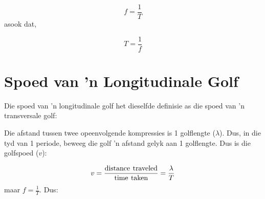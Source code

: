     \begin{equation}
    f=\frac{1}{T}
      \end{equation}
        \label{m38782*id291706}asook dat,\par 
        \label{m38782*id292764}\nopagebreak\noindent{}
    \begin{equation}
    T=\frac{1}{f}
      \end{equation}
      \label{m38782*uid11}
            \section{Spoed van 'n Longitudinale Golf}
            \nopagebreak
            \label{m38782*id292794}Die spoed van 'n longitudinale golf het dieselfde definisie as die spoed van 'n transversale golf:\par
%           

   
        \label{m38806*id319706}Die afstand tussen twee opeenvolgende kompressies is 1 golflengte ($\lambda$). Dus, in die tyd van 1 periode, beweeg die golf 'n afstand gelyk aan 1 golflengte. Dus is die golfspoed ($v$):\par 
        \label{m38806*id319732}\nopagebreak\noindent{}
    \begin{equation}
    v=\frac{\text{distance}\phantom{\rule{4.pt}{0ex}}\text{traveled}}{\text{time}\phantom{\rule{4.pt}{0ex}}\text{taken}}=\frac{\lambda }{T}
      \end{equation}
        \label{m38806*id319776}maar $f=\frac{1}{T}$. Dus:\par 
        \label{m38806*id319802}\nopagebreak\noindent{}
          
